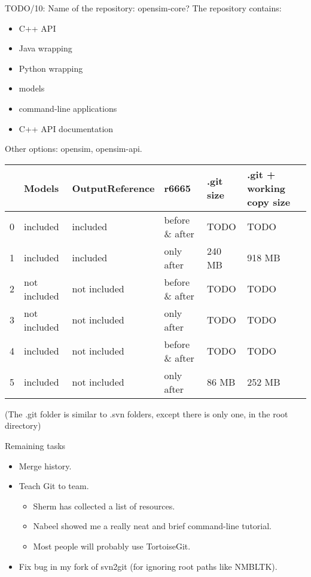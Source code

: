 \documentclass[pdf, 8pt]{beamer}
\def\NUMDECISIONS{10}
\begin{document}
\begin{frame}{TODO/\NUMDECISIONS: Name of the repository: opensim-core?}
The repository contains:
\begin{itemize}
    \item C++ API
    \item Java wrapping
    \item Python wrapping
    \item models
    \item command-line applications
    \item C++ API documentation
\end{itemize}

Other options: opensim, opensim-api.
\end{frame}

\begin{frame}[fragile]
    \begin{tabular}{l|l|l|l|l|p{2cm}}
      &  Models & OutputReference & r6665 & .git size & .git + working
      copy size \\ \hline
      0 & included & included & before \& after & TODO & TODO \\
      1 & included & included & only after & 240 MB & 918 MB \\
      2 & not included & not included & before \& after & TODO & TODO \\
      3 & not included & not included & only after & TODO & TODO \\
      4 & included & not included & before \& after & TODO & TODO \\
      5 & included & not included & only after & 86 MB & 252 MB \\
    \end{tabular}

    \vspace{2cm}
    (The .git folder is similar to .svn folders, except there is only one, in
    the root directory)
\end{frame}

\begin{frame}{Remaining tasks}
\begin{itemize}
\item Merge history.
\item Teach Git to team.
    \begin{itemize}
        \item Sherm has collected a list of resources.
        \item Nabeel showed me a really neat and brief command-line tutorial.
        \item Most people will probably use TortoiseGit.
    \end{itemize}
\item Fix bug in my fork of svn2git (for ignoring root paths like NMBLTK).
\end{itemize}
\end{frame}
\end{document}
